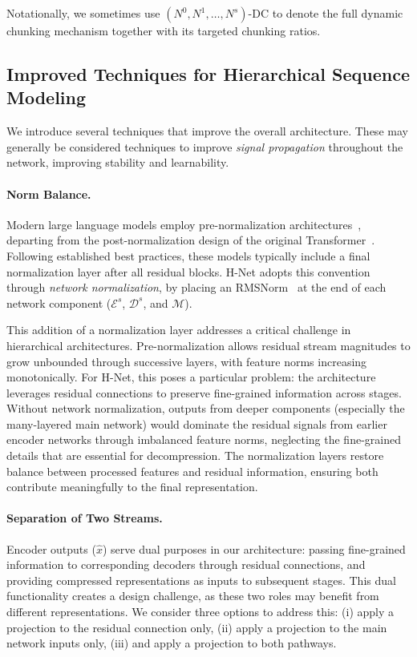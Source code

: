 \documentclass{article}
\newcommand{\citep}{\parencite}
\newcommand{\model}{H-Net}
\newcommand{\main}{main network}
\theoremstyle{plain}
\theoremstyle{remark}
\begin{document}
Notationally, we sometimes use $(N^0, N^1, \dots, N^s)$-DC to denote the full dynamic chunking mechanism together with its targeted chunking ratios.

\subsection{Improved Techniques for Hierarchical Sequence Modeling}
\label{sec: Improved-Techniques}

We introduce several techniques that improve the overall architecture.
These may generally be considered techniques to improve \emph{signal propagation} throughout the network, improving stability and learnability.

\paragraph{Norm Balance.}
Modern large language models employ pre-normalization architectures~\citep{GPT2, Llama}, departing from the post-normalization design of the original Transformer~\citep{Transformer}.
Following established best practices, these models typically include a final normalization layer after all residual blocks.
\model{} adopts this convention through \emph{network normalization}, by placing an RMSNorm~\citep{RMSNorm} at the end of each network component ($\mathcal{E}^s$, $\mathcal{D}^s$, and $\mathcal{M}$).

This addition of a normalization layer addresses a critical challenge in hierarchical architectures.
Pre-normalization allows residual stream magnitudes to grow unbounded through successive layers, with feature norms increasing monotonically.
For \model{}, this poses a particular problem: the architecture leverages residual connections to preserve fine-grained information across stages.
Without network normalization, outputs from deeper components (especially the many-layered \main{}) would dominate the residual signals from earlier encoder networks through imbalanced feature norms, neglecting the fine-grained details that are essential for decompression.
The normalization layers restore balance between processed features and residual information, ensuring both contribute meaningfully to the final representation.

\paragraph{Separation of Two Streams.}
Encoder outputs ($\hat{x}$) serve dual purposes in our architecture: passing fine-grained information to corresponding decoders through residual connections, and providing compressed representations as inputs to subsequent stages.
This dual functionality creates a design challenge, as these two roles may benefit from different representations.
We consider three options to address this: (i) apply a projection to the residual connection only, (ii) apply a projection to the main network inputs only, (iii) and apply a projection to both pathways.
\end{document}

